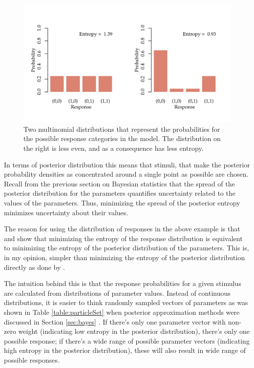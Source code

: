 \documentclass{article}\usepackage{knitr}
\begin{document}
\begin{figure}
\begin{center}
\begin{knitrout}
\color{fgcolor}
\includegraphics[width=\maxwidth]{figure/unnamed-chunk-15-1} 
\end{knitrout}
\end{center}
\caption{Two multinomial distributions that represent the probabilities for the possible response categories in the model. The distribution on the right is less even, and as a consequence has less entropy.}
\label{fig:entropy}
\end{figure}

In terms of posterior distribution this means that stimuli, that make the posterior probability densities as concentrated around a single point as possible are chosen. Recall from the previous section on Bayesian statistics that the spread of the posterior distribution for the parameters quantifies uncertainty related to the values of the parameters. Thus, minimizing the spread of the posterior entropy minimizes uncertainty about their values. 

The reason for using the distribution of responses in the above example is that \citet{kujalalukka2006} and \citet{kujala2011} show that minimizing the entropy of the response distribution is equivalent to minimizing the entropy of the posterior distribution of the parameters. This is, in my opinion, simpler than minimizing the entropy of the posterior distribution directly as done by \citet{kontsevichtyler1999}. 

The intuition behind this is that the response probabilities for a given stimulus are calculated from distributions of parameter values. Instead of continuous distributions, it is easier to think randomly sampled vectors of parameters as was shown in Table \ref{table:particleSet} when posterior approximation methods were discussed in Section \ref{sec:bayes} \textit{}. If there's only one parameter vector with non-zero weight (indicating low entropy in the posterior distribution), there's only one possible response; if there's a wide range of possible parameter vectors (indicating high entropy in the posterior distribution), these will also result in wide range of possible responses. 
\end{document}
